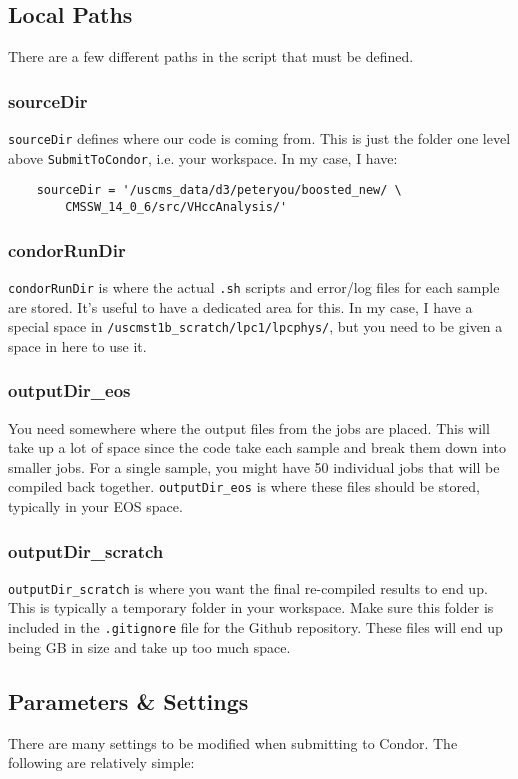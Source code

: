 \subsection{Local Paths}
There are a few different paths in the script that must be defined.

\subsubsection{sourceDir}
\verb|sourceDir| defines where our code is coming from. This is just the folder one level above \verb|SubmitToCondor|, i.e. your workspace. In my case, I have:

\begin{verbatim}
    sourceDir = '/uscms_data/d3/peteryou/boosted_new/ \
        CMSSW_14_0_6/src/VHccAnalysis/'
\end{verbatim}

\subsubsection{condorRunDir}
\verb|condorRunDir| is where the actual \verb|.sh| scripts and error/log files for each sample are stored. It's useful to have a dedicated area for this. In my case, I have a special space in \verb|/uscmst1b_scratch/lpc1/lpcphys/|, but you need to be given a space in here to use it.

\subsubsection{outputDir\_eos}
You need somewhere where the output files from the jobs are placed. This will take up a lot of space since the code take each sample and break them down into smaller jobs. For a single sample, you might have 50 individual jobs that will be compiled back together. \verb|outputDir_eos| is where these files should be stored, typically in your EOS space.

\subsubsection{outputDir\_scratch}
\verb|outputDir_scratch| is where you want the final re-compiled results to end up. This is typically a temporary folder in your workspace. Make sure this folder is included in the \verb|.gitignore| file for the Github repository. These files will end up being GB in size and take up too much space.

\subsection{Parameters \& Settings}
There are many settings to be modified when submitting to Condor. The following are relatively simple:

